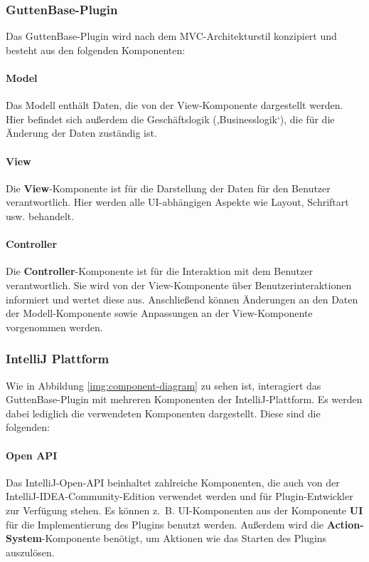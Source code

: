 	\subsubsection{GuttenBase-Plugin}
	Das GuttenBase-Plugin wird nach dem MVC-Architekturstil konzipiert und besteht aus den folgenden Komponenten:
	
	\paragraph*{Model}
	Das Modell enthält Daten, die von der View-Komponente dargestellt werden. Hier befindet sich außerdem die Geschäftslogik (,Businesslogik‘), die für die Änderung der Daten zuständig ist.
	
	\paragraph*{View}
	Die \textbf{View}-Komponente ist für die Darstellung der Daten für den Benutzer verantwortlich. Hier werden alle UI-abhängigen Aspekte wie Layout, Schriftart usw. behandelt.\\
	
	\paragraph*{Controller}
	Die \textbf{Controller}-Komponente ist für die Interaktion mit dem Benutzer verantwortlich. Sie wird von der View-Komponente über Benutzerinteraktionen informiert und wertet diese aus. Anschließend können Änderungen an den Daten der Modell-Komponente sowie Anpassungen an der View-Komponente vorgenommen werden.
	
	\subsubsection{IntelliJ Plattform}
	Wie in Abbildung \ref{img:component-diagram} zu sehen ist, interagiert das GuttenBase-Plugin mit mehreren Komponenten der IntelliJ-Plattform. Es werden dabei lediglich die verwendeten Komponenten dargestellt.
	Diese sind die folgenden:
	
	\paragraph*{Open API}
	Das IntelliJ-Open-API beinhaltet zahlreiche Komponenten, die auch von der IntelliJ-IDEA-Community-Edition verwendet werden und für Plugin-Entwickler zur Verfügung stehen. Es können z. B. UI-Komponenten aus der Komponente \textbf{UI} für die Implementierung des Plugins benutzt werden. Außerdem wird die \textbf{Action-System}-Komponente benötigt, um Aktionen wie das Starten des Plugins auszulösen.
	
